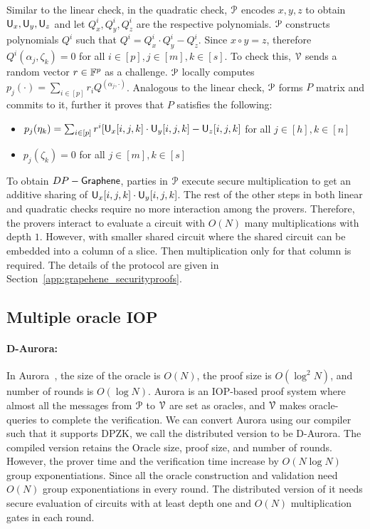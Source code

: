 Similar to the linear check, in the quadratic check, $\mathcal{P}$ encodes $x,y,z$ to obtain $\mathsf{U}_x, \mathsf{U}_y, \mathsf{U}_z$ and let $Q^i_x, Q^i_y, Q^i_z$ are the respective polynomials. $\mathcal{P}$ constructs polynomials $Q^i$ such that $Q^i = Q^i_x\cdot Q^i_y - Q^i_z$. Since $x\circ y = z$, therefore $Q^i(\alpha_j,\zeta_k) = 0$ for all $i\in[p], j\in[m], k\in[s]$. To check this, $\mathcal{V}$ sends a random vector $r\in \mathbb{F}^p$ as a challenge. $\mathcal{P}$ locally computes $p_j(\cdot) = \sum_{i \in [p]} r_i Q^(\alpha_j, \cdot)$. Analogous to the linear check, $\mathcal{P}$ forms $P$ matrix and commits to it, further it proves that $P$ satisfies the following:
\begin{itemize}
	\item $p_j(\eta_k) = \sum_{i\in[p]} r^i [\mathsf{U}_x[i,j,k] \cdot \mathsf{U}_y[i,j,k] - \mathsf{U}_z[i,j,k]$ for all $j \in [h], k \in [n]$
	\item $p_j (\zeta_k) = 0$ for all $j \in [m], k \in [s]$
\end{itemize}

To obtain $DP-\textsf{Graphene}$, parties in $\mathcal{P}$ execute secure multiplication to get an additive sharing of $\mathsf{U}_x[i,j,k] \cdot \mathsf{U}_y[i,j,k]$. The rest of the other steps in both linear and quadratic checks require no more interaction among the provers. Therefore, the provers interact to evaluate a circuit with $O(N)$ many multiplications with depth $1$. However, with smaller shared circuit where the shared circuit can be embedded into a column of a slice. Then multiplication only for that column is required. 
The details of the protocol are given in Section~\ref{app:grapehene_securityproofs}.


\subsection{Multiple oracle IOP}
\paragraph*{D-Aurora:}
In Aurora~\cite{aurora}, the size of the oracle is $O(N)$, the proof size is $O(\log^2 N)$, and number of rounds is $O(\log N)$. Aurora is an IOP-based proof system where almost all the messages from $\mathcal{P}$ to $\mathcal{V}$ are set as oracles, and $\mathcal{V}$ makes oracle-queries to complete the verification.
We can convert Aurora using our compiler such that it supports DPZK, we call the distributed version to be D-Aurora. The compiled version retains the Oracle size, proof size, and number of rounds. However, the prover time and the verification time increase by $O(N\log N)$ group exponentiations. Since all the oracle construction and validation need $O(N)$ group exponentiations in every round. The distributed version of it needs secure evaluation of circuits with at least depth one and $O(N)$ multiplication gates in each round.
